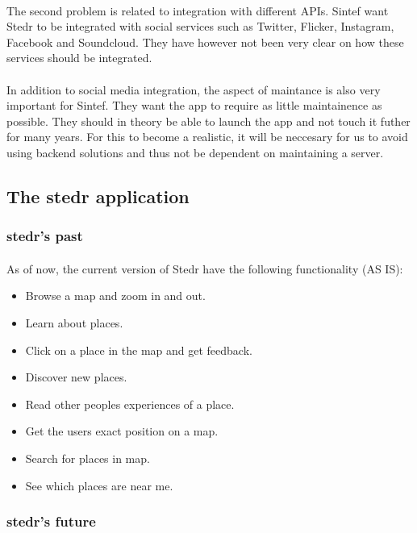 \documentclass[12pt,a4paper,titlepage]{article}
\begin{document}
				\paragraph{}
The second problem is related to integration with different APIs. Sintef want Stedr to be integrated with social services such as Twitter, Flicker, Instagram, Facebook and Soundcloud. They have however not been very clear on how these services should be integrated.
				\paragraph{}
In addition to social media integration, the aspect of maintance is also very important for Sintef. They want the app to require as little maintainence as possible. They should in theory be able to launch the app and not touch it futher for many years. For this to become a realistic, it will be neccesary for us to avoid using backend solutions and thus not be dependent on maintaining a server.

			\subsection{The stedr application}
				\subsubsection{stedr's past}
				\paragraph{}
As of now, the current version of Stedr have the following functionality (AS IS):
				\begin{itemize}
\item Browse a map and zoom in and out.
\item Learn about places.
\item Click on a place in the map and get feedback.
\item Discover new places.
\item Read other peoples experiences of a place.
\item Get the users exact position on a map.
\item Search for places in map.
\item See which places are near me.
				\end{itemize}
				\subsubsection{stedr's future}
\end{document}
